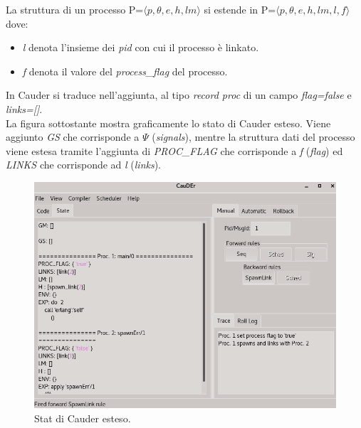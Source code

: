 \documentclass[Contributo.tex]{subfiles}
\begin{document}
La struttura di un processo P=$\displaystyle \langle p,\theta,e,h,lm \rangle$ si estende in P=$\displaystyle \langle p,\theta,e,h,lm,l,f \rangle$ dove:
	\begin{itemize}
		\item \textit{l} denota l'insieme dei \textit{pid} con cui il processo è linkato.
		\item \textit{f} denota il valore del \textit{process\_flag} del processo.
	\end{itemize}
In Cauder si traduce nell'aggiunta, al tipo \textit{record proc} di un campo \textit{flag=false} e \textit{links=[]}.\\
La figura sottostante mostra graficamente lo stato di Cauder esteso. Viene aggiunto \textit{GS} che corrisponde a $\Psi$ (\textit{signals}), mentre la struttura dati del processo viene estesa tramite l'aggiunta di \textit{PROC\_FLAG} che corrisponde a \textit{f} (\textit{flag}) ed \textit{LINKS} che corrisponde ad \textit{l} (\textit{links}).
\begin{figure}[H]
		\centerline{\includegraphics[scale=0.5]{./LavoroLuca/EstensioneCauder/Imgs/CauderStatoEsteso}}
		\caption{Stat di Cauder esteso.}
		\label{fig4}
	\end{figure}
\end{document}
